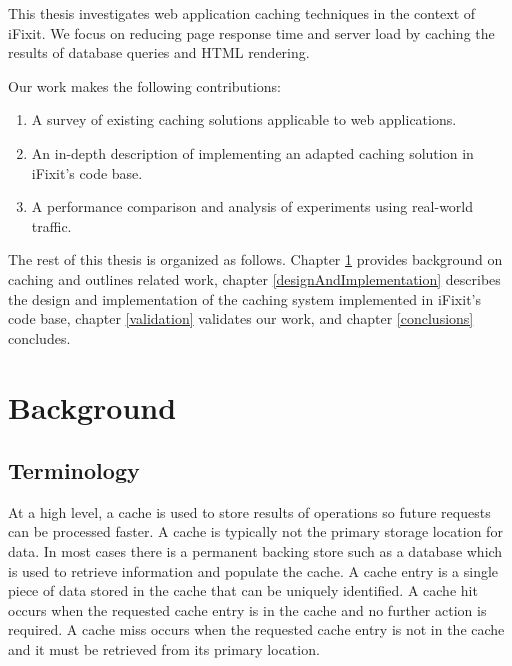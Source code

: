 \documentclass[12pt]{ucthesis}
\begin{document}
This thesis investigates web application caching techniques in the context of \textsf{iFixit}.
We focus on reducing page response time and server load by caching the results of database queries and HTML rendering.

Our work makes the following contributions:

\begin{enumerate}
   \item A survey of existing caching solutions applicable to web applications.
   \item An in-depth description of implementing an adapted caching solution in \textsf{iFixit}'s code base.
   \item A performance comparison and analysis of experiments using real-world traffic.
\end{enumerate}

The rest of this thesis is organized as follows.
Chapter \ref{background} provides background on caching and outlines related work, chapter \ref{designAndImplementation} describes the design and implementation of the caching system implemented in \textsf{iFixit}'s code base, chapter \ref{validation} validates our work, and chapter \ref{conclusions} concludes.


\chapter{Background} \label{background}
\section{Terminology}
At a high level, a cache is used to store results of operations so future requests can be processed faster.
A cache is typically not the primary storage location for data.
In most cases there is a permanent backing store such as a database which is used to retrieve information and populate the cache.
A cache entry is a single piece of data stored in the cache that can be uniquely identified.
A cache hit occurs when the requested cache entry is in the cache and no further action is required.
A cache miss occurs when the requested cache entry is not in the cache and it must be retrieved from its primary location.
\end{document}
